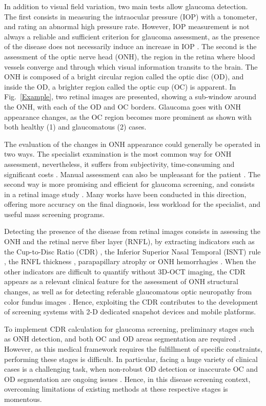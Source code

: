 In addition to visual field variation, two main tests allow glaucoma detection. The first consists in measuring the intraocular pressure (IOP) with a tonometer, and rating an abnormal high pressure rate. However, IOP measurement is not always a reliable and sufficient criterion for glaucoma assessment, as the presence of the disease does not necessarily induce an increase in IOP \citep{centreeyeres}.
The second is the assessment of the optic nerve head (ONH), the region in the retina where blood vessels converge and through which visual information transits to the brain. The ONH is composed of a bright circular region called the optic disc (OD), and inside the OD, a brighter region called the optic cup (OC) is apparent.
In \mbox{Fig. \ref{Example}}, two retinal images are presented, showing a sub-window around the ONH, with each of the OD and OC borders. Glaucoma goes with ONH appearance changes, as the OC region becomes more prominent as shown with both healthy (1) and glaucomatous (2) cases.

The evaluation of the changes in ONH appearance could generally be operated in two ways. The specialist examination is the most common way for ONH assessment, nevertheless, it suffers from subjectivity, time-consuming and significant costs \citep{liu}. Manual assessment can also be unpleasant for the patient \citep{ophthal1}.
The second way is more promising and efficient for glaucoma screening, and consists in a retinal image study \citep{abramoff}. Many works have been conducted in this direction, offering more accuracy on the final diagnosis, less workload for the specialist, and useful mass screening programs. 

Detecting the presence of the disease from retinal images consists in assessing the ONH and the retinal nerve fiber layer (RNFL), by extracting indicators such as the Cup-to-Disc Ratio (CDR) \citep{cdr}, the Inferior Superior Nasal Temporal (ISNT) rule \citep{isnt}, the RNFL thickness \citep{medeiros}, parapapillary atrophy \citep{Jonas} or ONH hemorrhagies \cite{fingeret}. When the other indicators are difficult to quantify without 3D-OCT imaging, the CDR appears as a relevant clinical feature for the assessment of ONH structural changes, as well as for detecting referable glaucomatous optic neuropathy from color fundus images \citep{foster2002definition, cheng}. Hence, exploiting the CDR contributes to the development of screening systems with 2-D dedicated snapshot devices and mobile platforms.

To implement CDR calculation for glaucoma screening, preliminary stages such as ONH detection, and both OC and OD areas segmentation are required \citep{singh2}. However, as this medical framework requires the fulfillment of specific constraints, performing these stages is difficult. In particular, facing a huge variety of clinical cases is a challenging task, when non-robust OD detection or inaccurate OC and OD segmentation are ongoing issues \citep{cheng}. Hence, in this disease screening context, overcoming limitations of existing methods at these respective stages is momentous.

